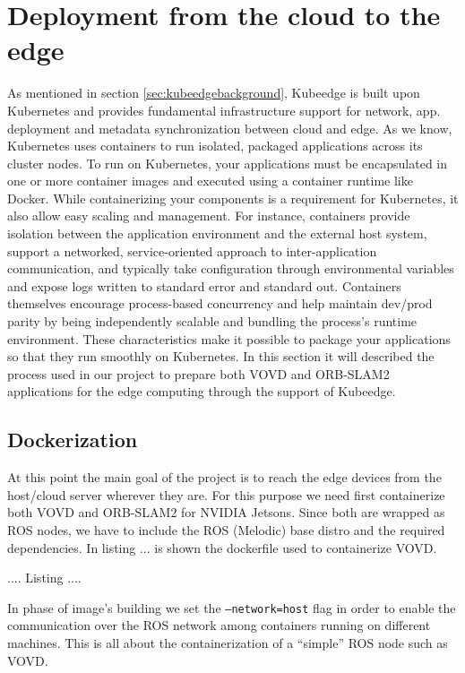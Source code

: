 \section{Deployment from the cloud to the edge} %
As mentioned in section \ref{sec:kubeedgebackground}, Kubeedge is built upon Kubernetes and provides fundamental infrastructure support for network, app. deployment and metadata synchronization between cloud and edge. As we know, Kubernetes uses containers to run isolated, packaged applications across its cluster nodes. To run on Kubernetes, your applications must be encapsulated in one or more container images and executed using a container runtime like Docker. While containerizing your components is a requirement for Kubernetes, it also allow easy scaling and management. For instance, containers provide isolation between the application environment and the external host system, support a networked, service-oriented approach to inter-application communication, and typically take configuration through environmental variables and expose logs written to standard error and standard out. Containers themselves encourage process-based concurrency and help maintain dev/prod parity by being independently scalable and bundling the process’s runtime environment. These characteristics make it possible to package your applications so that they run smoothly on Kubernetes.
In this section it will described the process used in our project to prepare both VOVD and ORB-SLAM2 applications for the edge computing through the support of Kubeedge.


\subsection{Dockerization}
At this point the main goal of the project is to reach the edge devices from the host/cloud server wherever they are.
For this purpose we need first containerize both VOVD and ORB-SLAM2 for NVIDIA Jetsons.
Since both are wrapped as ROS nodes, we have to include the ROS (Melodic) base distro and the required dependencies.
In listing ... is shown the dockerfile used to containerize VOVD.

....
Listing
....


In phase of image's building we set the \texttt{--network=host} flag in order to enable the communication over the ROS network among containers running on different machines.
This is all about the containerization of a ``simple'' ROS node such as VOVD.


